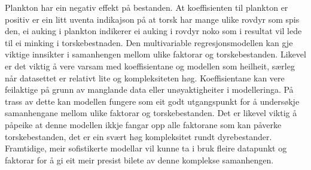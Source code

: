 \documentclass{report}
\begin{document}
Plankton har ein negativ effekt på bestanden. At koeffisienten til plankton er positiv er ein litt uventa indikajson på at torsk har mange ulike rovdyr som spis den, ei auking i plankton indikerer ei auking i rovdyr noko som i resultat vil lede til ei minking i torskebestnaden.
Den multivariable regresjonsmodellen kan gje viktige innsikter i samanhengen mellom ulike faktorar og torskebestanden.
Likevel er det viktig å vere varsam med koeffisientane og modellen som heilheit, særleg når datasettet er relativt lite og kompleksiteten høg.
Koeffisientane kan vere feilaktige på grunn av manglande data eller unøyaktigheiter i modelleringa.
På trass av dette kan modellen fungere som eit godt utgangspunkt for å undersøkje samanhengane mellom ulike faktorar og torskebestanden.
Det er likevel viktig å påpeike at denne modellen ikkje fangar opp alle faktorane som kan påverke torskebestanden, det er ein svært høg kompleksitet rundt dyrebestander.
Framtidige, meir sofistikerte modellar vil kunne ta i bruk fleire datapunkt og faktorar for å gi eit meir presist bilete av denne komplekse samanhengen.
\end{document}
